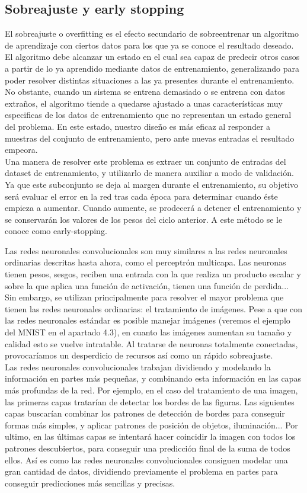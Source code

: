 \subsection{Sobreajuste y early stopping}
El sobreajuste o overfitting es el efecto secundario de sobreentrenar un algoritmo de aprendizaje con ciertos datos para los que ya se conoce el resultado deseado. El algoritmo debe alcanzar un estado en el cual sea capaz de predecir otros casos a partir de lo ya aprendido mediante datos de entrenamiento, generalizando para poder resolver distintas situaciones a las ya presentes durante el entrenamiento. No obstante, cuando un sistema se entrena demasiado o se entrena con datos extraños, el algoritmo tiende a quedarse ajustado a unas características muy especificas de los datos de entrenamiento que no representan un estado general del problema. En este estado, nuestro diseño es más eficaz al responder a muestras del conjunto de entrenamiento, pero ante nuevas entradas el resultado empeora.\\
Una manera de resolver este problema es extraer un conjunto de entradas del dataset de entrenamiento, y utilizarlo de manera auxiliar a modo de validación. Ya que este subconjunto se deja al margen durante el entrenamiento, su objetivo será evaluar el error en la red tras cada época para determinar cuando éste empieza a aumentar. Cuando aumente, se prodecerá a detener el entrenamiento y se conservarán los valores de los pesos del ciclo anterior. A este método se le conoce como early-stopping.

Las redes neuronales convolucionales son muy similares a las redes neuronales ordinarias descritas hasta ahora, como el perceptrón multicapa. Las neuronas tienen pesos, sesgos, reciben una entrada con la que realiza un producto escalar y sobre la que aplica una función de activación, tienen una función de perdida...\\
Sin embargo, se utilizan principalmente para resolver el mayor problema que tienen las redes neuronales ordinarias: el tratamiento de imágenes. Pese a que con las redes neuronales estándar es posible manejar imágenes (veremos el ejemplo del MNIST en el apartado 4.3), en cuanto las imágenes aumentan su tamaño y calidad esto se vuelve intratable. Al tratarse de neuronas totalmente conectadas, provocaríamos un desperdicio de recursos así como un rápido sobreajuste.\\
Las redes neuronales convolucionales trabajan dividiendo y modelando la información en partes más pequeñas, y combinando esta información en las capas más profundas de la red. Por ejemplo, en el caso del tratamiento de una imagen, las primeras capas tratarían de detectar los bordes de las figuras. Las siguientes capas buscarían combinar los patrones de detección de bordes para conseguir formas más simples, y aplicar patrones de posición de objetos, iluminación... Por ultimo, en las últimas capas se intentará hacer coincidir la imagen con todos los patrones descubiertos, para conseguir una predicción final de la suma de todos ellos. Así es como las redes neuronales convolucionales consiguen modelar una gran cantidad de datos, dividiendo previamente el problema en partes para conseguir predicciones más sencillas y precisas.
